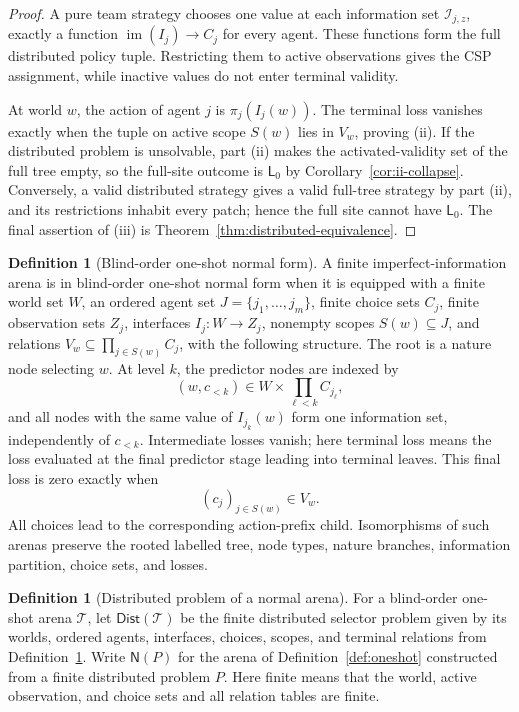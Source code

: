 \documentclass[11pt]{article}
\theoremstyle{plain}
\theoremstyle{definition}
\newtheorem{definition}[theorem]{Definition}
\theoremstyle{remark}
\newcommand{\im}{\operatorname{im}}
\begin{document}
\begin{proof}
A pure team strategy chooses one value at each information set
$\mathcal I_{j,z}$, exactly a function $\im(I_j)\to C_j$ for every agent. These
functions form the full distributed policy tuple. Restricting them to active
observations gives the CSP assignment, while inactive values do not enter
terminal validity.

At world $w$, the action of agent $j$ is $\pi_j(I_j(w))$. The terminal loss
vanishes exactly when the tuple on active scope $S(w)$ lies in $V_w$, proving
(ii). If the distributed problem is unsolvable, part (ii) makes the activated-validity
set of the full tree empty, so the full-site outcome is $\mathsf L_0$ by
Corollary~\ref{cor:ii-collapse}. Conversely, a valid distributed strategy gives
a valid full-tree strategy by part (ii), and its restrictions inhabit every
patch; hence the full site cannot have $\mathsf L_0$. The final assertion of
(iii) is Theorem~\ref{thm:distributed-equivalence}.
\end{proof}


\begin{definition}[Blind-order one-shot normal form]
\label{def:blind-one-shot}
A finite imperfect-information arena is in blind-order one-shot normal form when
it is equipped with a finite world set $W$, an ordered agent set
$J=\{j_1,\ldots,j_m\}$, finite choice sets $C_j$, finite observation sets
$Z_j$, interfaces $I_j:W\to Z_j$, nonempty scopes $S(w)\subseteq J$, and
relations $V_w\subseteq\prod_{j\in S(w)}C_j$, with the following structure.
The root is a nature node selecting $w$. At level $k$, the predictor nodes are
indexed by
\[
(w,c_{<k})\in W\times\prod_{\ell<k}C_{j_\ell},
\]
and all nodes with the same value of $I_{j_k}(w)$ form one information set,
independently of $c_{<k}$. Intermediate losses vanish; here terminal loss means the loss evaluated at the
final predictor stage leading into terminal leaves. This final loss is zero
exactly when
\[
(c_j)_{j\in S(w)}\in V_w.
\]
All choices lead to the corresponding action-prefix child. Isomorphisms of such
arenas preserve the rooted labelled tree, node types, nature branches,
information partition, choice sets, and losses.
\end{definition}

\begin{definition}[Distributed problem of a normal arena]
\label{def:arena-to-distributed}
For a blind-order one-shot arena $\mathcal T$, let
$\mathsf{Dist}(\mathcal T)$ be the finite distributed selector problem given by its
worlds, ordered agents, interfaces, choices, scopes, and terminal relations from
Definition~\ref{def:blind-one-shot}. Write $\mathsf N(P)$ for the arena of
Definition~\ref{def:oneshot} constructed from a finite distributed problem $P$.
Here finite means that the world, active observation, and choice sets and all
relation tables are finite.
\end{definition}
\end{document}
